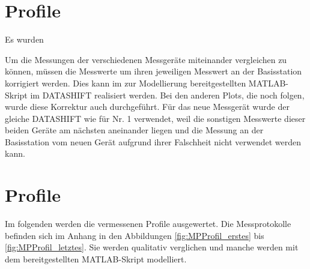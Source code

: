 \section{Profile}

Es wurden 


Um die Messungen der verschiedenen Messgeräte miteinander vergleichen zu können, müssen die Messwerte um ihren jeweiligen Messwert an der Basisstation korrigiert werden. Dies kann im zur Modellierung bereitgestellten MATLAB-Skript im DATASHIFT realisiert werden. Bei den anderen Plots, die noch folgen, wurde diese Korrektur auch durchgeführt. Für das neue Messgerät wurde der gleiche DATASHIFT wie für Nr. 1 verwendet, weil die sonstigen Messwerte dieser beiden Geräte am nächsten aneinander liegen und die Messung an der Basisstation vom neuen Gerät aufgrund ihrer Falschheit nicht verwendet werden kann.


\section{Profile}

Im folgenden werden die vermessenen Profile ausgewertet. Die Messprotokolle befinden sich im Anhang in den Abbildungen \ref{fig:MPProfil_erstes} bis \ref{fig:MPProfil_letztes}. Sie werden qualitativ verglichen und manche werden mit dem bereitgestellten MATLAB-Skript modelliert.

